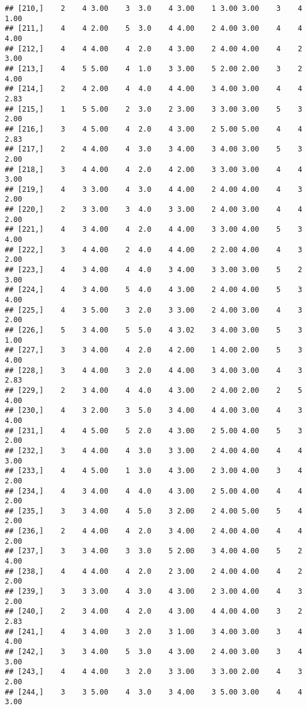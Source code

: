 \documentclass[]{article}
\begin{document}
\begin{verbatim}
## [210,]    2    4 3.00    3  3.0    4 3.00    1 3.00 3.00    3    4 1.00
## [211,]    4    4 2.00    5  3.0    4 4.00    2 4.00 3.00    4    4 4.00
## [212,]    4    4 4.00    4  2.0    4 3.00    2 4.00 4.00    4    2 3.00
## [213,]    4    5 5.00    4  1.0    3 3.00    5 2.00 2.00    3    2 4.00
## [214,]    2    4 2.00    4  4.0    4 4.00    3 4.00 3.00    4    4 2.83
## [215,]    1    5 5.00    2  3.0    2 3.00    3 3.00 3.00    5    3 2.00
## [216,]    3    4 5.00    4  2.0    4 3.00    2 5.00 5.00    4    4 2.83
## [217,]    2    4 4.00    4  3.0    3 4.00    3 4.00 3.00    5    3 2.00
## [218,]    3    4 4.00    4  2.0    4 2.00    3 3.00 3.00    4    4 3.00
## [219,]    4    3 3.00    4  3.0    4 4.00    2 4.00 4.00    4    3 2.00
## [220,]    2    3 3.00    3  4.0    3 3.00    2 4.00 3.00    4    4 2.00
## [221,]    4    3 4.00    4  2.0    4 4.00    3 3.00 4.00    5    3 4.00
## [222,]    3    4 4.00    2  4.0    4 4.00    2 2.00 4.00    4    3 2.00
## [223,]    4    3 4.00    4  4.0    3 4.00    3 3.00 3.00    5    2 3.00
## [224,]    4    3 4.00    5  4.0    4 3.00    2 4.00 4.00    5    3 4.00
## [225,]    4    3 5.00    3  2.0    3 3.00    2 4.00 3.00    4    3 2.00
## [226,]    5    3 4.00    5  5.0    4 3.02    3 4.00 3.00    5    3 1.00
## [227,]    3    3 4.00    4  2.0    4 2.00    1 4.00 2.00    5    3 4.00
## [228,]    3    4 4.00    3  2.0    4 4.00    3 4.00 3.00    4    3 2.83
## [229,]    2    3 4.00    4  4.0    4 3.00    2 4.00 2.00    2    5 4.00
## [230,]    4    3 2.00    3  5.0    3 4.00    4 4.00 3.00    4    3 4.00
## [231,]    4    4 5.00    5  2.0    4 3.00    2 5.00 4.00    5    3 2.00
## [232,]    3    4 4.00    4  3.0    3 3.00    2 4.00 4.00    4    4 3.00
## [233,]    4    4 5.00    1  3.0    4 3.00    2 3.00 4.00    3    4 2.00
## [234,]    4    3 4.00    4  4.0    4 3.00    2 5.00 4.00    4    4 2.00
## [235,]    3    3 4.00    4  5.0    3 2.00    2 4.00 5.00    5    4 2.00
## [236,]    2    4 4.00    4  2.0    3 4.00    2 4.00 4.00    4    4 2.00
## [237,]    3    3 4.00    3  3.0    5 2.00    3 4.00 4.00    5    2 4.00
## [238,]    4    4 4.00    4  2.0    2 3.00    2 4.00 4.00    4    2 2.00
## [239,]    3    3 3.00    4  3.0    4 3.00    2 3.00 4.00    4    3 2.00
## [240,]    2    3 4.00    4  2.0    4 3.00    4 4.00 4.00    3    2 2.83
## [241,]    4    3 4.00    3  2.0    3 1.00    3 4.00 3.00    3    4 4.00
## [242,]    3    3 4.00    5  3.0    4 3.00    2 4.00 3.00    3    4 3.00
## [243,]    4    4 4.00    3  2.0    3 3.00    3 3.00 2.00    4    3 2.00
## [244,]    3    3 5.00    4  3.0    3 4.00    3 5.00 3.00    4    4 3.00

\end{verbatim}
\end{document}
